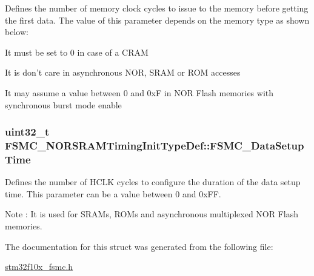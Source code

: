\label{structFSMC__NORSRAMTimingInitTypeDef_abc33886615fc3627448aa2dba11cfc77}
Defines the number of memory clock cycles to issue to the memory before getting the first data. The value of this parameter depends on the memory type as shown below:
\begin{DoxyItemize}
\item It must be set to 0 in case of a CRAM
\item It is don't care in asynchronous NOR, SRAM or ROM accesses
\item It may assume a value between 0 and 0xF in NOR Flash memories with synchronous burst mode enable 
\end{DoxyItemize}\hypertarget{structFSMC__NORSRAMTimingInitTypeDef_aaa0a9178766adeed424d5c4eb728d1b1}{
\subsubsection[{FSMC\_\-DataSetupTime}]{\setlength{\rightskip}{0pt plus 5cm}uint32\_\-t {\bf FSMC\_\-NORSRAMTimingInitTypeDef::FSMC\_\-DataSetupTime}}}
\label{structFSMC__NORSRAMTimingInitTypeDef_aaa0a9178766adeed424d5c4eb728d1b1}
Defines the number of HCLK cycles to configure the duration of the data setup time. This parameter can be a value between 0 and 0xFF. \begin{DoxyNote}{Note}
: It is used for SRAMs, ROMs and asynchronous multiplexed NOR Flash memories. 
\end{DoxyNote}


The documentation for this struct was generated from the following file:\begin{DoxyCompactItemize}
\item 
\hyperlink{stm32f10x__fsmc_8h}{stm32f10x\_\-fsmc.h}\end{DoxyCompactItemize}
